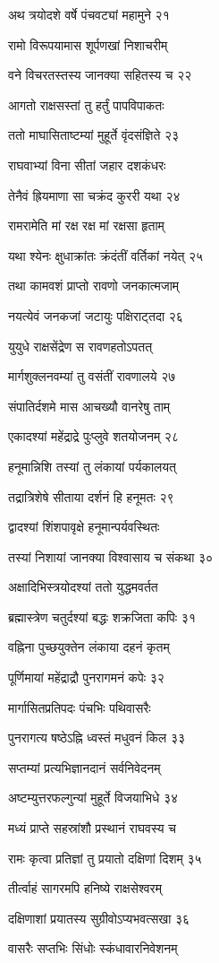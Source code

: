 अथ त्रयोदशे वर्षे पंचवट्यां महामुने २१

रामो विरूपयामास शूर्पणखां निशाचरीम्

वने विचरतस्तस्य जानक्या सहितस्य च २२

आगतो राक्षसस्तां तु हर्तुं पापविपाकतः

ततो माघासिताष्टम्यां मुहूर्ते वृंदसंज्ञिते २३

राघवाभ्यां विना सीतां जहार दशकंधरः

तेनैवं ह्रियमाणा सा चक्रंद कुररी यथा २४

रामरामेति मां रक्ष रक्ष मां रक्षसा हृताम्

यथा श्येनः क्षुधाक्रांतः क्रंदंतीं वर्तिकां नयेत् २५

तथा कामवशं प्राप्तो रावणो जनकात्मजाम्

नयत्येवं जनकजां जटायुः पक्षिराट्तदा २६

युयुधे राक्षसेंद्रेण स रावणहतोऽपतत्

मार्गशुक्लनवम्यां तु वसंतीं रावणालये २७

संपातिर्दशमे मास आचख्यौ वानरेषु ताम्

एकादश्यां महेंद्राद्रे पुःप्लुवे शतयोजनम् २८

हनूमान्निशि तस्यां तु लंकायां पर्यकालयत्

तद्रात्रिशेषे सीताया दर्शनं हि हनूमतः २९

द्वादश्यां शिंशपावृक्षे हनूमान्पर्यवस्थितः

तस्यां निशायां जानक्या विश्वासाय च संकथा ३०

अक्षादिभिस्त्रयोदश्यां ततो युद्धमवर्तत

ब्रह्मास्त्रेण चतुर्दश्यां बद्धः शक्रजिता कपिः ३१

वह्निना पुच्छयुक्तेन लंकाया दहनं कृतम्

पूर्णिमायां महेंद्राद्रौ पुनरागमनं कपेः ३२

मार्गासितप्रतिपदः पंचभिः पथिवासरैः

पुनरागत्य षष्ठेऽह्नि ध्वस्तं मधुवनं किल ३३

सप्तम्यां प्रत्यभिज्ञानदानं सर्वनिवेदनम्

अष्टम्युत्तरफल्गुन्यां मुहूर्ते विजयाभिधे ३४

मध्यं प्राप्ते सहस्रांशौ प्रस्थानं राघवस्य च

रामः कृत्वा प्रतिज्ञां तु प्रयातो दक्षिणां दिशम् ३५

तीर्त्वाहं सागरमपि हनिष्ये राक्षसेश्वरम्

दक्षिणाशां प्रयातस्य सुग्रीवोऽप्यभवत्सखा ३६

वासरैः सप्तभिः सिंधोः स्कंधावारनिवेशनम्

